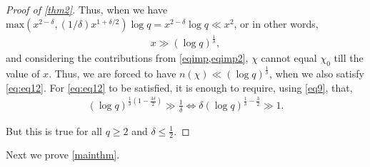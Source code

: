 \documentclass[letter,12pt]{article}
\theoremstyle{plain}
\theoremstyle{definition}
\theoremstyle{plain}
\begin{document}
\begin{proof}[Proof of \cref{thm2}]
\noindent Thus, when we have $\text{max}(x^{2-\delta}, (1/\delta)x^{1+\delta/2})\log q=x^{2-\delta}\log q\ll x^{2}$, or in other words,
\begin{align}\label{eq9}
   x\gg(\log q)^{\frac{1}{\delta}},
\end{align}
and considering the contributions from \cref{eqimp,eqimp2}, $ \chi$ cannot equal $\chi_0$ till the value of $x$. Thus, we are forced to have $n(\chi)\ll (\log q)^{\frac{1}{\delta}}$, when we also satisfy \cref{eq:eq12}. For \cref{eq:eq12} to be satisfied, it is enough to require, using \cref{eq9}, that, 
\begin{align}
    (\log q)^{\frac{1}{\delta}(1 -\frac{3\delta}{2})}\gg \frac{1}{\delta}\Leftrightarrow \delta(\log q)^{\frac{1}{\delta}-\frac{3}{2}}\gg 1.
\end{align}

But this is true for all $q\geq 2$ and $\delta\leq \frac{1}{2}$.
\end{proof}

Next we prove \cref{mainthm}. 

\bigskip
\end{document}
